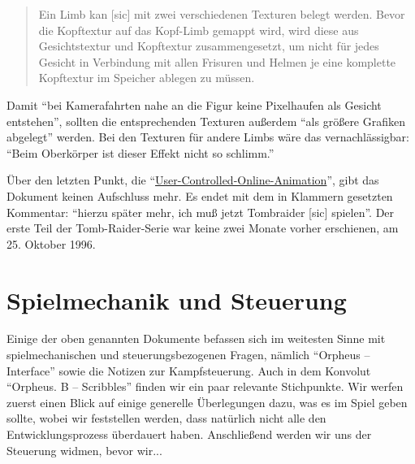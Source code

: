 \documentclass[a5paper,pagesize]{scrbook}
\begin{document}
\begin{quote}
   Ein Limb kan [sic] mit zwei verschiedenen Texturen belegt werden. 
   Bevor die Kopftextur auf das Kopf-Limb gemappt wird, wird diese aus Gesichtstextur und Kopftextur zusammengesetzt, um nicht für jedes Gesicht in Verbindung mit allen Frisuren und Helmen je eine komplette Kopftextur im Speicher ablegen zu müssen.\autocite[S.~2\,f.]{orpheus_zusammenfassung}
\end{quote}

\noindent Damit \enquote{bei Kamerafahrten nahe an die Figur keine Pixelhaufen als Gesicht entstehen}, sollten die entsprechenden Texturen außerdem \enquote{als größere Grafiken abgelegt} werden.
Bei den Texturen für andere Limbs wäre das vernachlässigbar: \enquote{Beim Oberkörper ist dieser Effekt nicht so schlimm.}\autocite[S.~2]{orpheus_zusammenfassung}

Über den letzten Punkt, die \enquote{\uline{User-Con\-trol\-led-On\-line-Ani\-ma\-ti\-on}}, gibt das Dokument keinen Aufschluss mehr. %
Es endet mit dem in Klammern gesetzten Kommentar: \enquote{hierzu später mehr, ich muß jetzt Tombraider [sic] spielen}.\autocite[S.~3]{orpheus_zusammenfassung}
Der erste Teil der Tomb-Raider-Serie war keine zwei Monate vorher erschienen, am 25. Oktober 1996.


\section{Spielmechanik und Steuerung}\label{sec:orpheus_mechanik}
Einige der oben genannten Dokumente befassen sich im weitesten Sinne mit spielmechanischen und steuerungsbezogenen Fragen, nämlich \enquote{Orpheus -- Interface} sowie die Notizen zur Kampfsteuerung.
Auch in dem Konvolut \enquote{Orpheus. B -- Scribbles} finden wir ein paar relevante Stichpunkte.
Wir werfen zuerst einen Blick auf einige generelle Überlegungen dazu, was es im Spiel geben sollte, wobei wir feststellen werden, dass natürlich nicht alle den Entwicklungsprozess überdauert haben.
Anschließend werden wir uns der Steuerung widmen, bevor wir...
\end{document}
